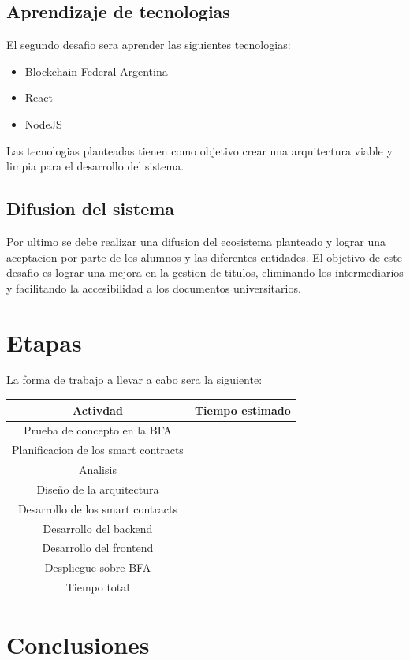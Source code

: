 \documentclass[11pt,a4paper]{article}
\begin{document}
        \subsection{Aprendizaje de tecnologias} 

            El segundo desafio sera aprender las siguientes tecnologias:
            
            \begin{itemize}
                \item Blockchain Federal Argentina
                \item React
                \item NodeJS
            \end{itemize}
            
            Las tecnologias planteadas tienen como objetivo crear una arquitectura viable y limpia para el desarrollo del sistema.
            
            
        \subsection{Difusion del sistema} 

            Por ultimo se debe realizar una difusion del ecosistema planteado y lograr una aceptacion por parte de los alumnos y las diferentes entidades.
            El objetivo de este desafio es lograr una mejora en la gestion de titulos, eliminando los intermediarios y facilitando la accesibilidad 
            a los documentos universitarios. 

    \section{Etapas}

        La forma de trabajo a llevar a cabo sera la siguiente:

        \begin{table}[H]
            \centering
            \begin{tabular}{|c|c|}
                \hline Activdad & Tiempo estimado \\ 
                \hline Prueba de concepto en la BFA & \\
                \hline Planificacion de los smart contracts & \\
                \hline Analisis & \\
                \hline Diseño de la arquitectura & \\ 
                \hline Desarrollo de los smart contracts & \\
                \hline Desarrollo del backend & \\ 
                \hline Desarrollo del frontend & \\ 
                \hline Despliegue sobre BFA & \\
                \hline Tiempo total & \\
                \hline
            \end{tabular}
            \label{tab:etapas}
        \end{table}

 
    \section{Conclusiones}




\end{document}
